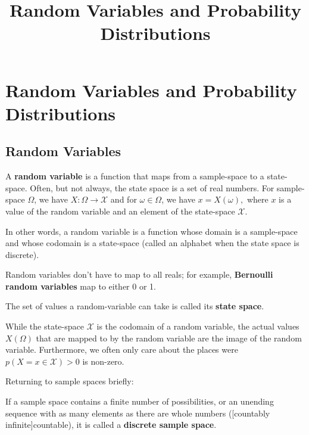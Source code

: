 \documentclass{article}
\title{Random Variables and Probability Distributions}
\begin{document}
\section{Random Variables and Probability Distributions}

\subsection{Random Variables}

\begin{definition}
	A \textbf{random variable} is a \@{function} that maps from a \@{sample-space} to a \@{state-space}. Often, but not always, the state space is a \@{set} of \@{real} numbers. For \@{sample-space} $\Omega$, we have $X: \Omega \to \mathcal{X}$ and for $\omega \in \Omega$, we have $x = X(\omega),$ where $x$ is a \@{value} of the random variable and an element of the \@{state-space} $\mathcal{X}$.

	In other words, a random variable is a function whose \@{domain} is a \@{sample-space} and whose \@{codomain} is a \@{state-space} (called an \@{alphabet} when the state space is \@{discrete}).
\end{definition}

\@{Random variables} don't have to map to all \@{reals}; for example, \textbf{Bernoulli random variables} map to either 0 or 1.

\begin{definition}
	The \@{set} of values a \@{random-variable} can take is called its \textbf{state space}.
\end{definition}
\begin{note}
	While the \@{state-space} $\mathcal{X}$ is the \@{codomain} of a random variable, the actual values $X(\Omega)$ that are mapped to by the random variable are the \@{image} of the random variable. Furthermore, we often only care about the places were $p(X = x \in \mathcal{X}) > 0$ is non-zero.
\end{note}

Returning to \@{sample spaces} briefly:

\begin{definition}
If a \@{sample space} contains a finite number of possibilities, or an unending \@{sequence} with as many elements as there are whole numbers (\@[countably infinite]{countable}), it is called a \textbf{discrete sample space}.
\end{definition}
\end{document}

